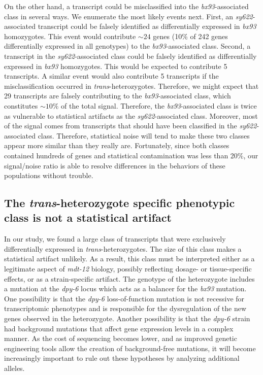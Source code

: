 \documentclass[10pt, twocolumn]{article}
\newcommand{\gene}[1]{\mbox{\emph{#1}}}
\newcommand{\dpy}{\gene{mdt-12}}
\begin{document}
On the other hand, a transcript could be
misclassified into the \emph{bx93}-associated class in several ways. We enumerate
the most likely events next. First, an \emph{sy622}-associated transcript could
be falsely identified as differentially expressed in \emph{bx93} homozygotes.
This event would contribute $\sim 24$ genes (10\% of 242 genes differentially
expressed in all genotypes) to the \emph{bx93}-associated class. Second, a
transcript in the \emph{sy622}-associated class could be falsely identified as
differentially expressed in \emph{bx93} homozygotes. This would be expected to
contribute 5 transcripts. A similar event would also contribute 5 transcripts if
the misclassification occurred in \emph{trans}-heterozygotes. Therefore, we
might expect that 29 transcripts are falsely contributing to the
\emph{bx93}-associated class, which constitutes $\sim 10\%$ of the total signal.
Therefore, the \emph{bx93}-associated class is twice as vulnerable to
statistical artifacts as the \emph{sy622}-associated class. Moreover, most of
the signal comes from transcripts that should have been classified in the
\emph{sy622}-associated class. Therefore, statistical noise will tend to make
these two classes appear more similar than they really are. Fortunately, since
both classes contained hundreds of genes and statistical contamination was less
than 20\%, our signal/noise ratio is able to resolve differences in the
behaviors of these populations without trouble.


\subsection*{The \emph{trans}-heterozygote specific phenotypic class is not a
             statistical artifact}
In our study, we found a large class of transcripts that were exclusively
differentially expressed in \emph{trans}-heterozygotes. The size of this class
makes a statistical artifact unlikely. As a result, this class must be
interpreted either as a legitimate aspect of \dpy{} biology, possibly reflecting
dosage- or tissue-specific effects, or as a strain-specific
artifact. The genotype of the heterozygote includes a mutation at the
\gene{dpy-6} locus which acts as a balancer for the \emph{bx93} mutation. One
possibility is that the \emph{dpy-6} loss-of-function mutation is not recessive
for transcriptomic phenotypes and is responsible for the dysregulation of the
new genes observed in the heterozygote. Another possibility is that the
\emph{dpy-6} strain had background mutations that affect gene expression levels
in a complex manner. As the cost of sequencing becomes lower, and as improved
genetic engineering tools allow the creation of background-free mutations,
it will become increasingly important to rule out these hypotheses by analyzing
additional alleles.
\end{document}
